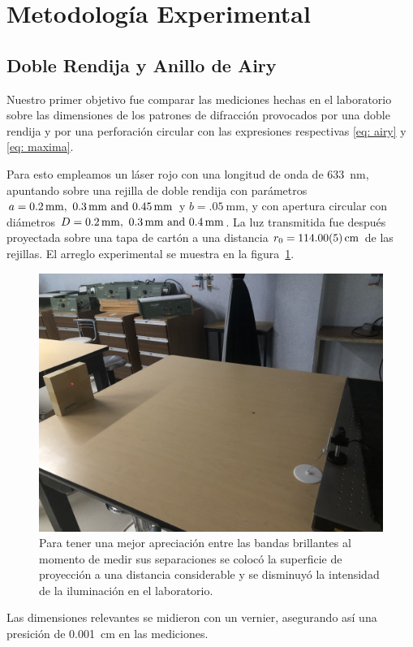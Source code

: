 \section{Metodología Experimental}
\subsection{Doble Rendija y Anillo de Airy}
Nuestro primer objetivo fue comparar las mediciones hechas en el laboratorio sobre las dimensiones de los patrones de difracción provocados por una doble rendija y por una perforación circular con las expresiones respectivas \eqref{eq: airy} y \eqref{eq: maxima}.

Para esto empleamos un láser rojo con una longitud de onda de \qty{633}{\nm}, apuntando sobre una rejilla de doble rendija con parámetros $a = \qtylist{.2; .3; .45}{\mm}$ y $b = \qty{.05}{\mm}$, y con apertura circular con diámetros $D = \qtylist{.2; .3;.4}{\mm}$. La luz transmitida fue después proyectada sobre una tapa de cartón a una distancia $r_0 = \qty{114\pm.05}{cm}$ de las rejillas. El arreglo experimental se muestra en la figura~\ref{fig: labo0}.
\begin{figure}[H]
	\centering
	\includegraphics[width=.9\linewidth, angle=180]{Imagenes/labo0}
	\caption{Para tener una mejor apreciación entre las bandas brillantes al momento de medir sus separaciones se colocó la superficie de proyección a una distancia considerable y se disminuyó la intensidad de la iluminación en el laboratorio.}
	\label{fig: labo0}
\end{figure}

Las dimensiones relevantes se midieron con un vernier, asegurando así una presición de \qty{.001}{\cm} en las mediciones.

